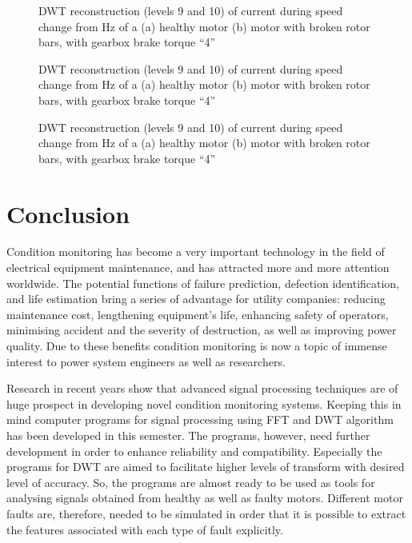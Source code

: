 \documentclass[a4paper,11pt]{report}
\begin{document}
\begin{figure}[htbp]
\centering
\subfigure[]{\texttt{[image: h430sc]}}
\subfigure[]{\texttt{[image: b430sc]}}
\caption{DWT reconstruction (levels 9 and 10) of current during speed change from \unit[30]{Hz} of a (a) healthy motor (b) motor with broken rotor bars, with gearbox brake torque ``4''} \label{hb430sc}
\end{figure}

\begin{figure}[htbp]
\centering
\subfigure[]{\texttt{[image: h440sc]}}
\subfigure[]{\texttt{[image: b440sc]}}
\caption{DWT reconstruction (levels 9 and 10) of current during speed change from \unit[40]{Hz} of a (a) healthy motor (b) motor with broken rotor bars, with gearbox brake torque ``4''} \label{hb440sc}
\end{figure}

\begin{figure}[htbp]
\centering
\subfigure[]{\texttt{[image: h450sc]}}
\subfigure[]{\texttt{[image: b450sc]}}
\caption{DWT reconstruction (levels 9 and 10) of current during speed change from \unit[50]{Hz} of a (a) healthy motor (b) motor with broken rotor bars, with gearbox brake torque ``4''} \label{hb450sc}
\end{figure}

\chapter{Conclusion}
Condition monitoring has become a very important technology in the field of electrical equipment maintenance, and has attracted more and more attention worldwide. The potential functions of failure prediction, defection identification, and life estimation bring a series of advantage for utility companies: reducing maintenance cost, lengthening equipment's life, enhancing safety of operators, minimising accident and the severity of destruction, as well as improving power quality. Due to these benefits condition monitoring is now a topic of immense interest to power system engineers as well as researchers.

Research in recent years show that advanced signal processing techniques are of huge prospect in developing novel condition monitoring systems. Keeping this in mind computer programs for signal processing using FFT and DWT algorithm has been developed in this semester. The programs, however, need further development in order to enhance reliability and compatibility. Especially the programs for DWT are aimed to facilitate higher levels of transform with desired level of accuracy. So, the programs are almost ready to be used as tools for analysing signals obtained from healthy as well as faulty motors. Different motor faults are, therefore, needed to be simulated in order that it is possible to extract the features associated with each type of fault explicitly.
\end{document}
